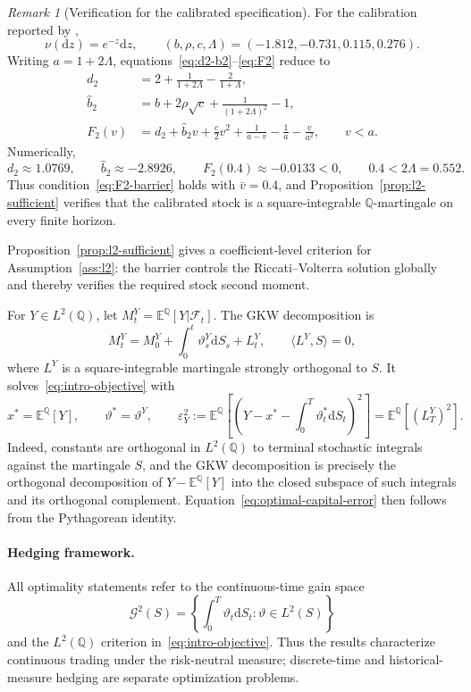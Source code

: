 \documentclass[11pt]{article}
\theoremstyle{definition}
\theoremstyle{remark}
\newtheorem{remark}[theorem]{Remark}
\newcommand{\E}{\mathbb{E}}
\newcommand{\Q}{\mathbb{Q}}
\newcommand{\F}{\mathcal{F}}
\newcommand{\1}{\mathbf{1}}
\newcommand{\dd}{\mathrm{d}}
\begin{document}
\begin{remark}[Verification for the calibrated specification]
\label{rem:calibrated-l2}
For the calibration reported by \citet{bondi2024},
\[
 \nu(\dd z)=e^{-z}\dd z,
 \qquad
 (b,\rho,c,\Lambda)=(-1.812,-0.731,0.115,0.276).
\]
Writing $a=1+2\Lambda$, equations~\eqref{eq:d2-b2}--\eqref{eq:F2}
reduce to
\begin{align*}
 d_2&=2+\frac{1}{1+2\Lambda}-\frac{2}{1+\Lambda},\\
 \widehat b_2&=b+2\rho\sqrt c+\frac{1}{(1+2\Lambda)^2}-1,\\
 F_2(v)&=d_2+\widehat b_2v+\frac c2v^2
   +\frac{1}{a-v}-\frac{1}{a}-\frac{v}{a^2},
 \qquad v<a.
\end{align*}
Numerically,
\[
 d_2\approx1.0769,
 \qquad
 \widehat b_2\approx-2.8926,
 \qquad
 F_2(0.4)\approx-0.0133<0,
 \qquad
 0.4<2\Lambda=0.552.
\]
Thus condition~\eqref{eq:F2-barrier} holds with $\bar v=0.4$, and
Proposition~\ref{prop:l2-sufficient} verifies that the calibrated stock is a
square-integrable $\Q$-martingale on every finite horizon.
\end{remark}


Proposition~\ref{prop:l2-sufficient} gives a coefficient-level criterion for
Assumption~\ref{ass:l2}: the barrier controls the Riccati--Volterra solution
globally and thereby verifies the required stock second moment.

For $Y\in L^2(\Q)$, let $M_t^Y=\E^\Q[Y|\F_t]$. The GKW decomposition
\citep{galtchouk1976,kunitawatanabe1967} is
\begin{equation}
\label{eq:gkw-general}
 M_t^Y=M_0^Y+\int_0^t\vartheta_s^Y\dd S_s+L_t^Y,
 \qquad \langle L^Y,S\rangle=0,
\end{equation}
where $L^Y$ is a square-integrable martingale strongly orthogonal to $S$. It
solves~\eqref{eq:intro-objective} with
\begin{equation}
\label{eq:optimal-capital-error}
 x^*=\E^\Q[Y],\qquad
 \vartheta^*=\vartheta^Y,
 \qquad
 \varepsilon_Y^2
 :=\E^\Q\left[
   \left(Y-x^*-\int_0^T\vartheta_t^*\dd S_t\right)^2
 \right]
 =\E^\Q[(L_T^Y)^2].
\end{equation}
Indeed, constants are orthogonal in $L^2(\Q)$ to terminal stochastic
integrals against the martingale $S$, and the GKW decomposition is precisely
the orthogonal decomposition of $Y-\E^\Q[Y]$ into the closed subspace of such
integrals and its orthogonal complement. Equation~\eqref{eq:optimal-capital-error}
then follows from the Pythagorean identity.

\paragraph{Hedging framework.}
All optimality statements refer to the continuous-time gain space
\[
 \mathcal G^2(S)=
 \left\{\int_0^T\vartheta_t\dd S_t:\vartheta\in L^2(S)\right\}
\]
and the $L^2(\Q)$ criterion in~\eqref{eq:intro-objective}. Thus the results characterize
continuous trading under the risk-neutral measure; discrete-time and
historical-measure hedging are separate optimization problems.
\end{document}
